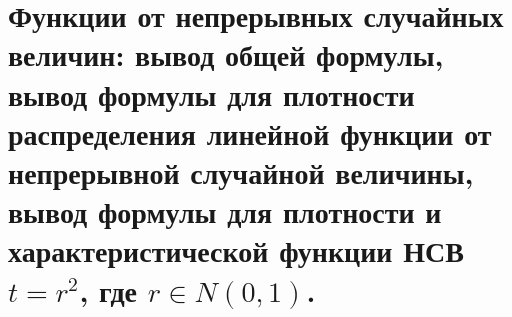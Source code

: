 \documentclass[polytech/stats/exam-2023/stats-exam-2023.tex]{subfiles}
\begin{document}
\section{Функции от непрерывных случайных величин: вывод общей формулы, вывод формулы для плотности распределения линейной функции от непрерывной случайной величины, вывод формулы для плотности и характеристической функции НСВ $t = r^2$, где $r\in N(0, 1)$.}
\end{document}
